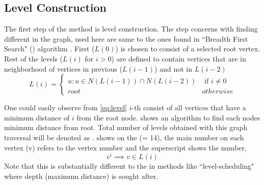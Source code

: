 \subsection{Level Construction}\label{subsec:LEVEL_CONST}
The first step of the \RACE method is level construction. The step concerns with finding different \levels in the graph, \levels used here are same to the ones found in ``Breadth First Search" (\BFS) algorithm \cite{BFS}. First \level ($L(0)$) is chosen to consist of a selected root vertex. Rest of the levels ($L(i)$ for $i > 0$) are defined to  contain vertices that are in neighborhood of vertices in previous \level ($L(i-1)$) and not in $L(i-2)$ \cite{BFS_level_def} \ie
\begin{equation}\label{eq:level}
L(i) = 
\begin{cases}
	  u : u \in N(L(i-1)) \cap \overline{N(L(i-2))}  & \text{ if } i \neq 0 \\
	 root & otherwise
\end{cases}   
\end{equation}

 One could easily observe from \cref{eq:level} $i$-th \level consist of all vertices that have a minimum distance of $i$ from the root node.  shows an algorithm to find each nodes minimum distance from root. Total number of levels obtained with this graph traversal will be denoted as \totalLvl.  shows \levels on the \STEX (\totalLvl = 14), the main number on each vertex (v) refers to the vertex number and the superscript shows the \level number, \ie
\begin{equation}\label{eq:node_notation}
	v^i \implies v \in L(i)
\end{equation}
Note that this is substantially different to the \levels in methods like ``level-scheduling" \cite{saad} where depth (maximum distance) is sought after.

